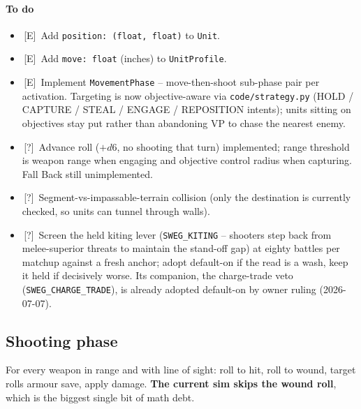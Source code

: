 \documentclass[11pt,a4paper]{article}
\newcommand{\eddie}{\textcolor{eddieblue}{\textsf{[E]}}}
\newcommand{\either}{\textcolor{eithergrey}{\textsf{[?]}}}
\newcommand{\todo}{\ding{109}\,}    %
\newcommand{\done}{\ding{51}\,}     %
\begin{document}
\paragraph{To do}
\begin{itemize}[label={},leftmargin=*,itemsep=2pt]
  \item \done \eddie\ Add \texttt{position: (float, float)} to
    \texttt{Unit}.
  \item \done \eddie\ Add \texttt{move: float} (inches) to
    \texttt{UnitProfile}.
  \item \done \eddie\ Implement \texttt{MovementPhase} -- move-then-shoot
    sub-phase pair per activation. Targeting is now objective-aware via
    \texttt{code/strategy.py} (HOLD / CAPTURE / STEAL / ENGAGE /
    REPOSITION intents); units sitting on objectives stay put rather
    than abandoning VP to chase the nearest enemy.
  \item \done \either\ Advance roll ($+d6$, no shooting that turn)
    implemented; range threshold is weapon range when engaging and
    objective control radius when capturing. Fall Back still
    unimplemented.
  \item \todo \either\ Segment-vs-impassable-terrain collision (only
    the destination is currently checked, so units can tunnel through
    walls).
  \item \todo \either\ Screen the held kiting lever
    (\texttt{SWEG\_KITING} -- shooters step back from melee-superior
    threats to maintain the stand-off gap) at eighty battles per
    matchup against a fresh anchor; adopt default-on if the read is a
    wash, keep it held if decisively worse. Its companion, the
    charge-trade veto (\texttt{SWEG\_CHARGE\_TRADE}), is already
    adopted default-on by owner ruling (2026-07-07).
\end{itemize}

\subsection{Shooting phase}
For every weapon in range and with line of sight: roll to hit, roll to
wound, target rolls armour save, apply damage. \textbf{The current sim
skips the wound roll}, which is the biggest single bit of math debt.
\end{document}
